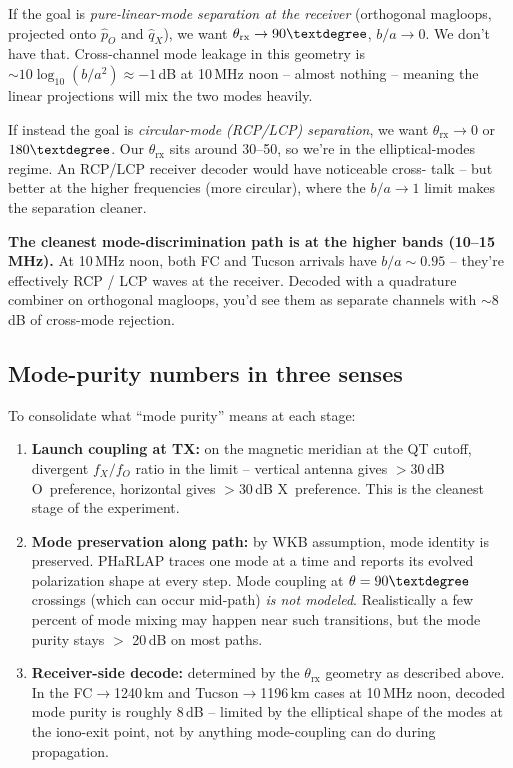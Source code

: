 \documentclass[11pt]{article}
\begin{document}
If the goal is \emph{pure-linear-mode separation at the receiver}
(orthogonal magloops, projected onto $\hat{p}_O$ and $\hat{q}_X$),
we want $\theta_\text{rx}\to 90\textdegree$, $b/a\to 0$.  We don't
have that.  Cross-channel mode leakage in this geometry is
$\sim 10\log_{10}(b/a^2) \approx -1$\,dB at 10\,MHz noon -- almost
nothing -- meaning the linear projections will mix the two modes
heavily.

If instead the goal is \emph{circular-mode (RCP/LCP) separation},
we want $\theta_\text{rx}\to 0$ or $180\textdegree$.  Our $\theta_\text{rx}$
sits around 30--50\textdegree, so we're in the elliptical-modes
regime.  An RCP/LCP receiver decoder would have noticeable cross-
talk -- but better at the higher frequencies (more circular), where
the $b/a\to 1$ limit makes the separation cleaner.

\textbf{The cleanest mode-discrimination path is at the higher
bands (10--15\,MHz).}  At 10\,MHz noon, both FC and Tucson arrivals
have $b/a\sim 0.95$ -- they're effectively RCP / LCP waves at the
receiver.  Decoded with a quadrature combiner on orthogonal
magloops, you'd see them as separate channels with $\sim$8\,dB of
cross-mode rejection.

\subsection*{Mode-purity numbers in three senses}

To consolidate what ``mode purity'' means at each stage:

\begin{enumerate}
\item \textbf{Launch coupling at TX:}  on the magnetic meridian at
the QT cutoff, divergent $f_X/f_O$ ratio in the limit -- vertical
antenna gives $> 30$\,dB O~preference, horizontal gives $> 30$\,dB
X~preference.  This is the cleanest stage of the experiment.

\item \textbf{Mode preservation along path:}  by WKB assumption,
mode identity is preserved.  PHaRLAP traces one mode at a time and
reports its evolved polarization shape at every step.  Mode coupling
at $\theta=90\textdegree$ crossings (which can occur mid-path)
\emph{is not modeled}.  Realistically a few percent of mode mixing
may happen near such transitions, but the mode purity stays $>$ 20\,dB
on most paths.

\item \textbf{Receiver-side decode:}  determined by the $\theta_\text{rx}$
geometry as described above.  In the FC$\to$1240\,km and Tucson$\to$1196\,km
cases at 10\,MHz noon, decoded mode purity is roughly 8\,dB --
limited by the elliptical shape of the modes at the iono-exit
point, not by anything mode-coupling can do during propagation.
\end{enumerate}
\end{document}
